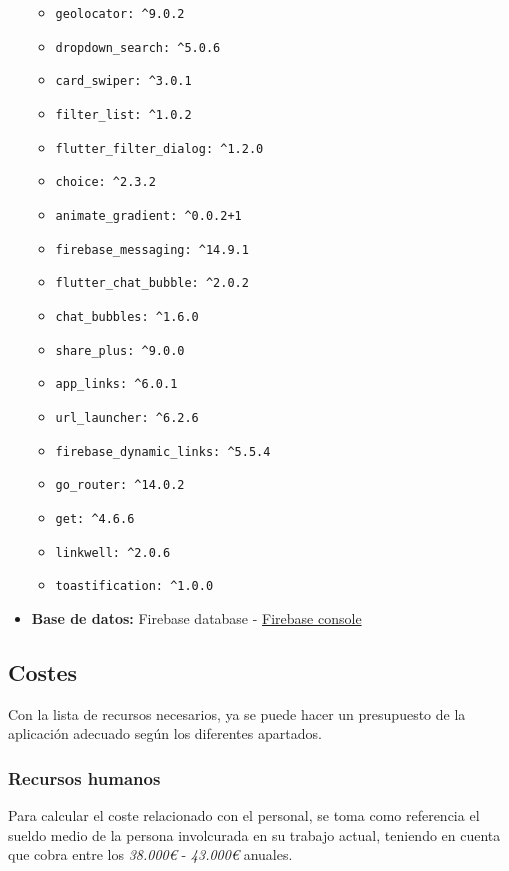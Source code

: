 \documentclass[a4paper, 12pt]{article}
\begin{document}
\begin{itemize}
\begin{itemize}
		  \item \texttt{geolocator: \^{}9.0.2}
		  \item \texttt{dropdown\_search: \^{}5.0.6}
		  \item \texttt{card\_swiper: \^{}3.0.1}
		  \item \texttt{filter\_list: \^{}1.0.2}
		  \item \texttt{flutter\_filter\_dialog: \^{}1.2.0}
		  \item \texttt{choice: \^{}2.3.2}
		  \item \texttt{animate\_gradient: \^{}0.0.2+1}
		  \item \texttt{firebase\_messaging: \^{}14.9.1}
		  \item \texttt{flutter\_chat\_bubble: \^{}2.0.2}
		  \item \texttt{chat\_bubbles: \^{}1.6.0}
		  \item \texttt{share\_plus: \^{}9.0.0}
		  \item \texttt{app\_links: \^{}6.0.1}
		  \item \texttt{url\_launcher: \^{}6.2.6}
		  \item \texttt{firebase\_dynamic\_links: \^{}5.5.4}
		  \item \texttt{go\_router: \^{}14.0.2}
		  \item \texttt{get: \^{}4.6.6}
		  \item \texttt{linkwell: \^{}2.0.6}
		  \item \texttt{toastification: \^{}1.0.0}
		\end{itemize}
	\item \textbf{Base de datos:} Firebase database - \href{https://console.firebase.google.com}{Firebase console}
\end{itemize}


\subsection{Costes}

Con la lista de recursos necesarios, ya se puede hacer un presupuesto de la aplicación adecuado según los diferentes apartados.

\subsubsection{Recursos humanos}

Para calcular el coste relacionado con el personal, se toma como referencia el sueldo medio de la persona involcurada en su trabajo actual, teniendo en cuenta que cobra entre los \textit{38.000€ } - \textit{43.000€ } anuales.
\end{document}
